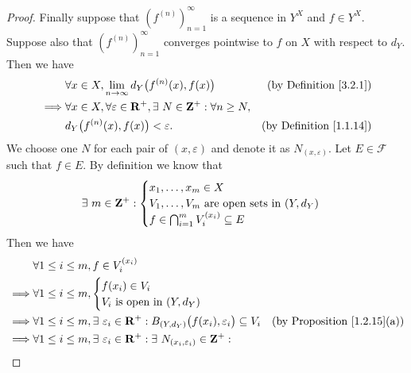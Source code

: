 \begin{proof}
    Finally suppose that \((f^{(n)})_{n = 1}^\infty\) is a sequence in \(Y^X\) and \(f \in Y^X\).
    Suppose also that \((f^{(n)})_{n = 1}^\infty\) converges pointwise to \(f\) on \(X\) with respect to \(d_Y\).
    Then we have
    \begin{align*}
                 & \forall x \in X, \lim_{n \to \infty} d_Y\big(f^{(n)}(x), f(x)\big)                     & \text{(by Definition \ref{3.2.1})}  \\
        \implies & \forall x \in X, \forall \varepsilon \in \mathbf{R}^+, \exists\ N \in \mathbf{Z}^+ : \forall n \geq N,                                       \\
                 & d_Y\big(f^{(n)}(x), f(x)\big) < \varepsilon.                                           & \text{(by Definition \ref{1.1.14})}
    \end{align*}
    We choose one \(N\) for each pair of \((x, \varepsilon)\) and denote it as \(N_{(x, \varepsilon)}\).
    Let \(E \in \mathcal{F}\) such that \(f \in E\).
    By definition we know that
    \[
        \exists\ m \in \mathbf{Z}^+ : \begin{cases}
            x_1, \dots, x_m \in X                              \\
            V_1, \dots, V_m \text{ are open sets in } (Y, d_Y) \\
            f \in \bigcap_{i = 1}^m V_i^{(x_i)} \subseteq E
        \end{cases}
    \]
    Then we have
    \begin{align*}
                 & \forall 1 \leq i \leq m, f \in V_i^{(x_i)}                                                                                                                                        \\
        \implies & \forall 1 \leq i \leq m, \begin{cases}
                                                f(x_i) \in V_i \\
                                                V_i \text{ is open in } (Y, d_Y)
                                            \end{cases}                                                                                                                          \\
        \implies & \forall 1 \leq i \leq m, \exists\ \varepsilon_i \in \R^+ : B_{(Y, d_Y)}\big(f(x_i), \varepsilon_i\big) \subseteq V_i                    & \text{(by Proposition \ref{1.2.15}(a))} \\
        \implies & \forall 1 \leq i \leq m, \exists\ \varepsilon_i \in \R^+ : \exists\ N_{(x_i, \varepsilon_i)} \in \Z^+ :                                                                           \\

\end{align*}
\end{proof}
